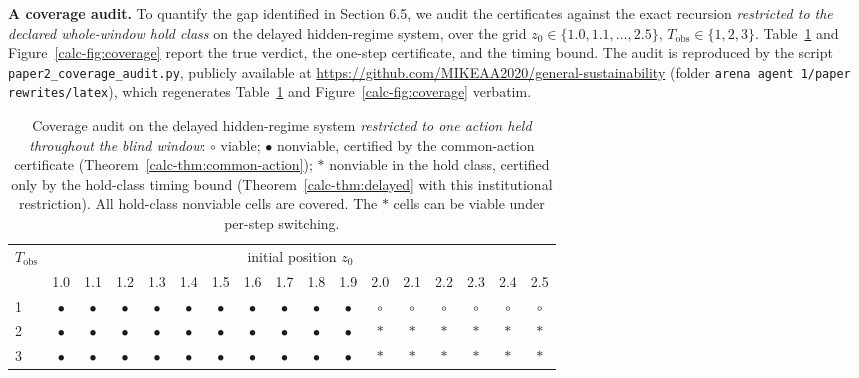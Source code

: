 \documentclass[10pt,twocolumn]{article}
\theoremstyle{definition}
\begin{document}
\textbf{A coverage audit.} To quantify the gap identified in Section 6.5, we audit the certificates against the exact recursion \emph{restricted to the declared whole-window hold class} on the delayed hidden-regime system, over the grid \(z_{0} \in \{1.0, 1.1, \dots, 2.5\}\), \(T_{\mathrm{obs}} \in \{1,2,3\}\). Table~\ref{calc-tab:coverage} and Figure~\ref{calc-fig:coverage} report the true verdict, the one-step certificate, and the timing bound. The audit is reproduced by the script \texttt{paper2\_coverage\_audit.py}, publicly available at \url{https://github.com/MIKEAA2020/general-sustainability} (folder \texttt{arena agent 1/paper rewrites/latex}), which regenerates Table~\ref{calc-tab:coverage} and Figure~\ref{calc-fig:coverage} verbatim.

\begin{table}[t]
\centering
\footnotesize
\begin{tabular}{@{}lcccccccccccccccc@{}}
\toprule
\(T_{\mathrm{obs}}\) & \multicolumn{16}{c}{initial position \(z_{0}\)} \\
\cmidrule(lr){2-17}
 & 1.0 & 1.1 & 1.2 & 1.3 & 1.4 & 1.5 & 1.6 & 1.7 & 1.8 & 1.9 & 2.0 & 2.1 & 2.2 & 2.3 & 2.4 & 2.5 \\
\midrule
1 & \(\bullet\) & \(\bullet\) & \(\bullet\) & \(\bullet\) & \(\bullet\) & \(\bullet\) & \(\bullet\) & \(\bullet\) & \(\bullet\) & \(\bullet\) & \(\circ\) & \(\circ\) & \(\circ\) & \(\circ\) & \(\circ\) & \(\circ\) \\
2 & \(\bullet\) & \(\bullet\) & \(\bullet\) & \(\bullet\) & \(\bullet\) & \(\bullet\) & \(\bullet\) & \(\bullet\) & \(\bullet\) & \(\bullet\) & \(\ast\) & \(\ast\) & \(\ast\) & \(\ast\) & \(\ast\) & \(\ast\) \\
3 & \(\bullet\) & \(\bullet\) & \(\bullet\) & \(\bullet\) & \(\bullet\) & \(\bullet\) & \(\bullet\) & \(\bullet\) & \(\bullet\) & \(\bullet\) & \(\ast\) & \(\ast\) & \(\ast\) & \(\ast\) & \(\ast\) & \(\ast\) \\
\bottomrule
\end{tabular}
\caption{Coverage audit on the delayed hidden-regime system \emph{restricted to one action held throughout the blind window}: \(\circ\) viable; \(\bullet\) nonviable, certified by the common-action certificate (Theorem~\ref{calc-thm:common-action}); \(\ast\) nonviable in the hold class, certified only by the hold-class timing bound (Theorem~\ref{calc-thm:delayed} with this institutional restriction). All hold-class nonviable cells are covered. The \(\ast\) cells can be viable under per-step switching.}
\label{calc-tab:coverage}
\end{table}
\end{document}
